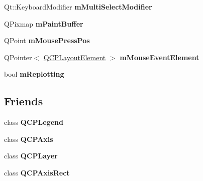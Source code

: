 \begin{DoxyCompactItemize}
\item 
\hypertarget{classQCustomPlot_a0e97e701c5671e7e463d2ce0211d0f8a}{}Qt\+::\+Keyboard\+Modifier {\bfseries m\+Multi\+Select\+Modifier}\label{classQCustomPlot_a0e97e701c5671e7e463d2ce0211d0f8a}

\item 
\hypertarget{classQCustomPlot_a753630df96e0672098d9e88bd41d1913}{}Q\+Pixmap {\bfseries m\+Paint\+Buffer}\label{classQCustomPlot_a753630df96e0672098d9e88bd41d1913}

\item 
\hypertarget{classQCustomPlot_ac57090da95056ae4dd67be67adfa85bd}{}Q\+Point {\bfseries m\+Mouse\+Press\+Pos}\label{classQCustomPlot_ac57090da95056ae4dd67be67adfa85bd}

\item 
\hypertarget{classQCustomPlot_a2f2e8b25e59cf3cf7b15e4767c02e747}{}Q\+Pointer$<$ \hyperlink{classQCPLayoutElement}{Q\+C\+P\+Layout\+Element} $>$ {\bfseries m\+Mouse\+Event\+Element}\label{classQCustomPlot_a2f2e8b25e59cf3cf7b15e4767c02e747}

\item 
\hypertarget{classQCustomPlot_ab30daeca6612c3948afd368dce5f1c39}{}bool {\bfseries m\+Replotting}\label{classQCustomPlot_ab30daeca6612c3948afd368dce5f1c39}

\end{DoxyCompactItemize}
\subsection*{Friends}
\begin{DoxyCompactItemize}
\item 
\hypertarget{classQCustomPlot_a8429035e7adfbd7f05805a6530ad5e3b}{}class {\bfseries Q\+C\+P\+Legend}\label{classQCustomPlot_a8429035e7adfbd7f05805a6530ad5e3b}

\item 
\hypertarget{classQCustomPlot_af123edeca169ec7a31958a1d714e1a8a}{}class {\bfseries Q\+C\+P\+Axis}\label{classQCustomPlot_af123edeca169ec7a31958a1d714e1a8a}

\item 
\hypertarget{classQCustomPlot_a5dbf96bf7664c1b6fce49063eeea6eef}{}class {\bfseries Q\+C\+P\+Layer}\label{classQCustomPlot_a5dbf96bf7664c1b6fce49063eeea6eef}

\item 
\hypertarget{classQCustomPlot_acbf20ecb140f66c5fd1bc64ae0762990}{}class {\bfseries Q\+C\+P\+Axis\+Rect}\label{classQCustomPlot_acbf20ecb140f66c5fd1bc64ae0762990}

\end{DoxyCompactItemize}


